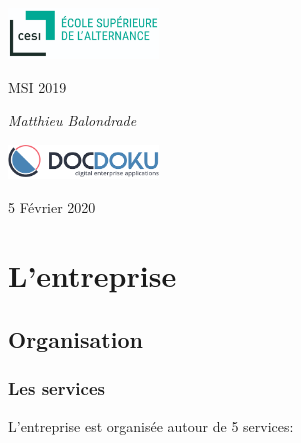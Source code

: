 \documentclass[11pt]{report}
\title{\Huge \color{burntorange}{Dossier entreprise DocDoku}}
\author{\Large Matthieu \bsc{Balondrade} \\ MSI 2019 }
\date{\Large 5 Février 2020}
\begin{document}
\begin{titlepage}
	\centering
	\includegraphics[width=0.3\textwidth]{cesi.png}\par\vspace{1cm}
	{\scshape\Large MSI 2019\par}
	\vspace{3cm}
	{\huge\bfseries \color{burntorange}{Dossier entreprise}\par}
	\vspace{2cm}
	{\Large\itshape Matthieu Balondrade\par}\vspace{2cm}
	\vfill

	\includegraphics[width=0.3\textwidth]{docdoku.png}\par\vspace{2cm}\par
	{\large 5 Février 2020\par}


\end{titlepage}
\tableofcontents

\part{L'entreprise}

	\chapter{Organisation}

		\section{Les services}

			L'entreprise est organisée autour de 5 services:\\
\end{document}
